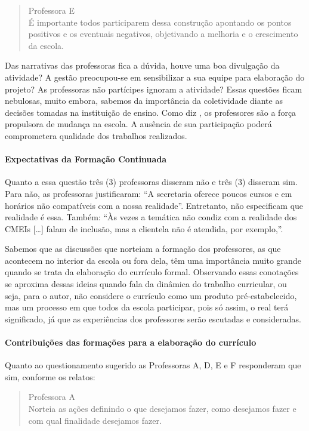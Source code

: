 \begin{refsection}
\begin{quotation}
        \negpar[-1.5em]{}Professora E\quad{}\\É importante todos participarem dessa construção apontando os pontos positivos e os eventuais negativos, objetivando a melhoria e o crescimento da escola. 
    \end{quotation}

    Das narrativas das professoras fica a dúvida, houve uma boa divulgação da atividade? A gestão preocupou-se em sensibilizar a sua equipe para elaboração do projeto? As professoras não partícipes ignoram a atividade? Essas questões ficam nebulosas, muito embora, sabemos da importância da coletividade diante as decisões tomadas na instituição de ensino. Como diz \textcite{MORGADO2005Currículo}, os professores são a força propulsora de mudança na escola. A ausência de sua participação poderá comprometera qualidade dos trabalhos realizados. 

    \paragraph{Expectativas da Formação Continuada} Quanto a essa questão três (3) professoras disseram não e três (3) disseram sim. Para não, as professoras justificaram: “A secretaria oferece poucos cursos e em horários não compatíveis com a nossa realidade”. Entretanto, não especificam que realidade é essa. Também: “Às vezes a temática não condiz com a realidade dos CMEIs [\dots] falam de inclusão, mas a clientela não é atendida, por exemplo,”.  

    Sabemos que as discussões que norteiam a formação dos professores, as que acontecem no interior da escola ou fora dela, têm uma importância muito grande quando se trata da elaboração do currículo formal. Observando essas conotações \textcite{OLIVEIRA2013Novas} se aproxima dessas ideias quando fala da dinâmica do trabalho curricular, ou seja, para o autor, não considere o currículo como um produto pré‐estabelecido, mas um processo em que todos da escola participar, pois só assim, o real terá significado, já que as experiências dos professores serão escutadas e consideradas. 

    \paragraph{Contribuições das formações para a elaboração do currículo} Quanto ao questionamento sugerido as Professoras A, D, E e F responderam que sim, conforme os relatos: 

    \begin{quotation}
        \noindent\negpar[-1.5em]{}Professora A\quad{}\\Norteia as ações definindo o que desejamos fazer, como desejamos fazer e com qual finalidade desejamos fazer. 
        \medskip
    

\end{quotation}
\end{refsection}
